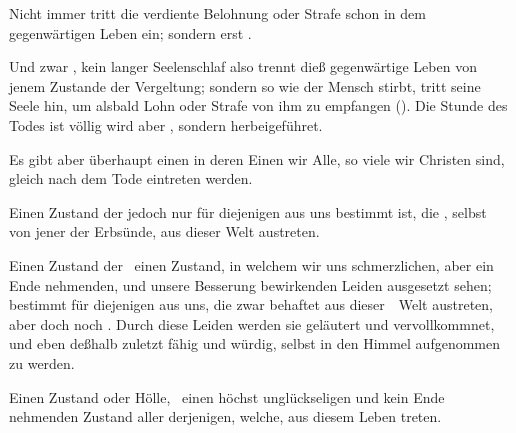 \begin{aufza}
\item Nicht immer tritt die verdiente Belohnung oder Strafe schon in dem gegenwärtigen Leben ein; sondern erst .
\item Und zwar , kein langer Seelenschlaf also trennt dieß gegenwärtige Leben von jenem Zustande der Vergeltung; sondern so wie der Mensch stirbt, tritt seine Seele  hin, um alsbald Lohn oder Strafe von ihm zu empfangen (). Die Stunde des Todes ist völlig  wird aber , sondern  herbeigeführet.
\item Es gibt aber überhaupt einen  in deren Einen wir Alle, so viele wir Christen sind, gleich nach dem Tode eintreten werden.
\begin{aufzb}
\item Einen Zustand  der jedoch nur für diejenigen aus uns bestimmt ist, die , selbst von jener der Erbsünde, aus dieser Welt austreten.
\item Einen Zustand der  \dh\ einen Zustand, in welchem wir uns schmerzlichen, aber ein Ende nehmenden, und unsere Besserung bewirkenden Leiden ausgesetzt sehen; bestimmt für diejenigen aus uns, die zwar  behaftet aus dieser~\ Welt austreten, aber doch noch . Durch diese Leiden werden sie geläutert und vervollkommnet, und eben deßhalb zuletzt fähig und würdig, selbst in den Himmel aufgenommen zu werden.
\item Einen Zustand  oder Hölle, \dh\ einen höchst unglückseligen und kein Ende nehmenden Zustand aller derjenigen, welche,  aus diesem Leben treten.
\end{aufzb}

\end{aufza}
